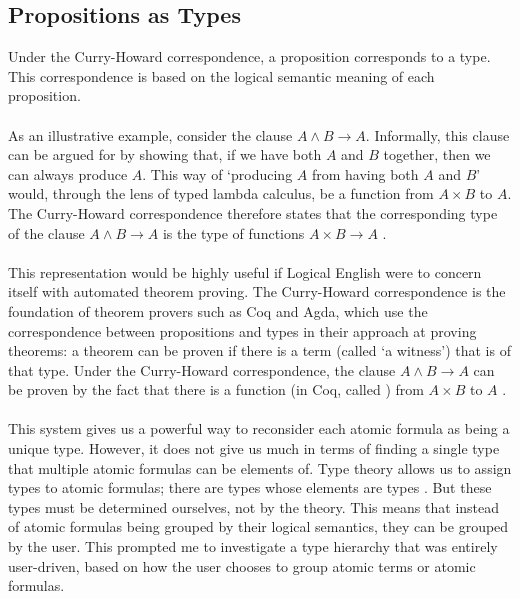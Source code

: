 \documentclass[../main.tex]{subfiles}
\begin{document}
\subsection{Propositions as Types}
\label{section:props-as-types}
Under the Curry-Howard correspondence, a proposition corresponds to a type. This correspondence is based on the logical semantic meaning of each proposition. 
\\
\\
As an illustrative example, consider the clause $A \land B \longrightarrow A$. Informally, this clause can be argued for by showing that, if we have both $A$ and $B$ together, then we can always produce $A$. This way of `producing $A$ from having both $A$ and $B$' would, through the lens of typed lambda calculus, be a function from $A \times B$ to $A$. The Curry-Howard correspondence therefore states that the corresponding type of the clause $A \land B \longrightarrow A$ is the type of functions $A \times B \longrightarrow A$ \cite{lambda_calc}.
\\
\\
This representation would be highly useful if Logical English were to concern itself with automated theorem proving. The Curry-Howard correspondence is the foundation of theorem provers such as Coq and Agda, which use the correspondence between propositions and types in their approach at proving theorems: a theorem can be proven if there is a term (called `a witness') that is of that type. Under the Curry-Howard correspondence, the clause $A \land B \longrightarrow A$ can be proven by the fact that there is a function (in Coq, called ) from $A \times B$ to $A$ \cite{lambda_calc}.
\\
\\
This system gives us a powerful way to reconsider each atomic formula as being a unique type. However, it does not give us much in terms of finding a single type that multiple atomic formulas can be elements of. Type theory allows us to assign types to atomic formulas; there are types whose elements are types \cite[p.~24]{homotopy_type_theory}. But these types must be determined ourselves, not by the theory. This means that instead of atomic formulas being grouped by their logical semantics, they can be grouped by the user. This prompted me to investigate a type hierarchy that was entirely user-driven, based on how the user chooses to group atomic terms or atomic formulas.

\end{document}
